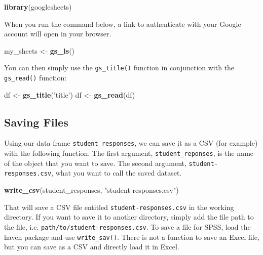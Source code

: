 \documentclass[]{book}
\newenvironment{Shaded}{\begin{snugshade}}{\end{snugshade}}
\newcommand{\KeywordTok}[1]{\textcolor[rgb]{0.13,0.29,0.53}{\textbf{#1}}}
\newcommand{\StringTok}[1]{\textcolor[rgb]{0.31,0.60,0.02}{#1}}
\newcommand{\NormalTok}[1]{#1}
\begin{document}
\begin{Shaded}
\begin{Highlighting}[]
\KeywordTok{library}\NormalTok{(googlesheets)}
\end{Highlighting}
\end{Shaded}

When you run the command below, a link to authenticate with your Google
account will open in your browser.

\begin{Shaded}
\begin{Highlighting}[]
\NormalTok{my_sheets <-}\StringTok{ }\KeywordTok{gs_ls}\NormalTok{()}
\end{Highlighting}
\end{Shaded}

You can then simply use the \texttt{gs\_title()} function in conjunction
with the \texttt{gs\_read()} function:

\begin{Shaded}
\begin{Highlighting}[]
\NormalTok{df <-}\StringTok{ }\KeywordTok{gs_title}\NormalTok{(}\StringTok{'title'}\NormalTok{)}
\NormalTok{df <-}\StringTok{ }\KeywordTok{gs_read}\NormalTok{(df)}
\end{Highlighting}
\end{Shaded}

\subsection{Saving Files}\label{saving-files}

Using our data frame \texttt{student\_responses}, we can save it as a
CSV (for example) with the following function. The first argument,
\texttt{student\_reponses}, is the name of the object that you want to
save. The second argument, \texttt{student-responses.csv}, what you want
to call the saved dataset.

\begin{Shaded}
\begin{Highlighting}[]
\KeywordTok{write_csv}\NormalTok{(student_responses, }\StringTok{"student-responses.csv"}\NormalTok{)}
\end{Highlighting}
\end{Shaded}

That will save a CSV file entitled \texttt{student-responses.csv} in the
working directory. If you want to save it to another directory, simply
add the file path to the file, i.e.
\texttt{path/to/student-responses.csv}. To save a file for SPSS, load
the haven package and use \texttt{write\_sav()}. There is not a function
to save an Excel file, but you can save as a CSV and directly load it in
Excel.
\end{document}
